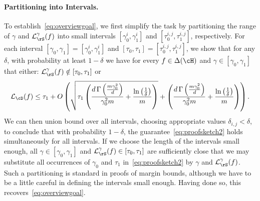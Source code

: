 \paragraph{Partitioning into Intervals.}
To establish~\cref{eq:overviewgoal}, we first simplify the task by partitioning the range of $\gamma$ and $\ls_\rS^\gamma(f)$ into small intervals $[\gamma_0^i,\gamma_1^i]$ and $[\tau_0^{i,j},\tau_1^{i,j}]$, respectively. For each interval $[\gamma_0,\gamma_1]=[\gamma_0^i,\gamma_1^i]$ and $[\tau_0,\tau_1] = [\tau_0^{i,j},\tau_1^{i,j}]$, we show that for any $\delta$, with probability at least $1-\delta$ we have for every $f \in \dlh$ and $\gamma \in [\gamma_0,\gamma_1]$ that either: $\ls^\gamma_{\rS}(f) \notin [\tau_0,\tau_1]$ or
\begin{align}\label{eq:proofsketch2}
 \ls_{\cD}(f)\leq \tau_{1}+O\left(\sqrt{\tau_{1}\left(\frac{d\func{\left(\frac{m \gamma_{0}^{2}}{d} \right)}}{\gamma_{0}^{2}m}+\frac{\ln{\left(\frac{1}{\delta}\right)}}{m} \right)}+\left(\frac{d\func{\left(\frac{m\gamma_{0}^{2}}{d} \right)}}{\gamma_{0}^{2}m}+\frac{\ln{\left(\frac{1}{\delta}\right)}}{m} \right) \right).
\end{align}
We can then union bound over all intervals, choosing appropriate values $\delta_{i,j} < \delta$, to conclude that with probability $1-\delta$, the guarantee~\cref{eq:proofsketch2} holds simultaneously for all intervals. If we choose the length of the intervals small enough, all $\gamma \in [\gamma_0, \gamma_1]$ and $\ls^\gamma_{\rS}(f) \in [\tau_0,\tau_1]$ are sufficiently close that we may substitute all occurrences of $\gamma_0$ and $\tau_1$ in~\cref{eq:proofsketch2} by $\gamma$ and $\ls^\gamma_{\rS}(f)$. Such a partitioning is standard in proofs of margin bounds, although we have to be a little careful in defining the intervals small enough. Having done so, this recovers~\cref{eq:overviewgoal}.



